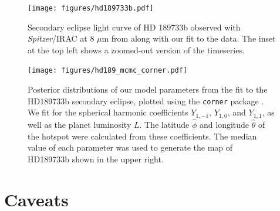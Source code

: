 \documentclass[modern]{aastex61}
\begin{document}
%
\begin{figure}[t!]
    \begin{centering}
    \texttt{[image: figures/hd189733b.pdf]}
    \caption{\label{fig:hd189_mcmc_fit} Secondary eclipse light curve of
             HD 189733b observed with \textit{Spitzer}/IRAC at 8 $\mu$m from
             \citet{Knutson2007} along with our fit to the data. The inset
             at the top left shows a zoomed-out version of the timeseries.
             }
    \end{centering}
\end{figure}
%
\begin{figure}[t!]
    \begin{centering}
    \texttt{[image: figures/hd189\_mcmc\_corner.pdf]}
    \caption{\label{fig:hd189_mcmc_corner} Posterior distributions
             of our model parameters from the fit to the HD189733b
             secondary eclipse, plotted using the \texttt{corner} package
             \citep{Foreman-Mackey2016}. We fit for the spherical harmonic
             coefficients $Y_{1,-1}$,
             $Y_{1,0}$, and $Y_{1,1}$, as well as the planet luminosity $L$. The
             latitude $\hat{\phi}$ and longitude $\hat{\theta}$
             of the hotspot were calculated from these coefficients. The median
             value of each parameter was used to generate the map of HD189733b
             shown in the upper right. }
    \end{centering}
\end{figure}
%

\section{Caveats}
\label{sec:caveats}
\end{document}

